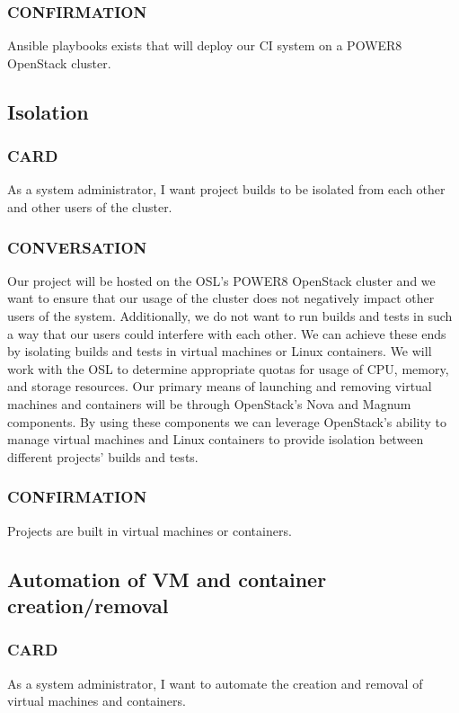 \documentclass[10pt,letterpaper,onecolumn,journal]{IEEEtran}
\begin{document}
\subsubsection{CONFIRMATION}
Ansible playbooks exists that will deploy our CI system on a POWER8 OpenStack cluster.

\subsection{Isolation}
\subsubsection{CARD}
As a system administrator, I want project builds to be isolated from each other and other users of the cluster.
\subsubsection{CONVERSATION}
Our project will be hosted on the OSL's POWER8 OpenStack cluster and we want to ensure that our usage of the cluster does not negatively impact other users of the system.
Additionally, we do not want to run builds and tests in such a way that our users could interfere with each other.
We can achieve these ends by isolating builds and tests in virtual machines or Linux containers.
We will work with the OSL to determine appropriate quotas for usage of CPU, memory, and storage resources.
Our primary means of launching and removing virtual machines and containers will be through OpenStack's Nova and Magnum components.
By using these components we can leverage OpenStack's ability to manage virtual machines and Linux containers to provide isolation between different projects' builds and tests.
\subsubsection{CONFIRMATION}
Projects are built in virtual machines or containers.

\subsection{Automation of VM and container creation/removal}
\subsubsection{CARD}
As a system administrator, I want to automate the creation and removal of virtual machines and containers.
\end{document}
